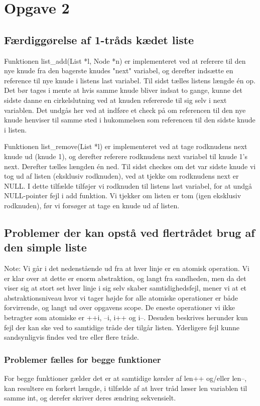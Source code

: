 \section{Opgave 2}

\subsection{Færdiggørelse af 1-tråds kædet liste}
Funktionen list\_add(List *l, Node *n) er implementeret ved at referere til den nye knude fra den bagerste knudes "next" variabel, og derefter indsætte en reference til nye knude i listens last variabel. Til sidst tælles listens længde én op. 
Det bør tages i mente at hvis samme knude bliver indsat to gange, kunne det sidste danne en cirkelslutning ved at knuden refererede til sig selv i next variablen. Det undgås her ved at indføre et check på om referencen til den nye knude henviser til samme sted i hukommelsen som referencen til den sidste knude i listen.

Funktionen list\_remove(List *l) er implementeret ved at tage rodknudens next knude ud (knude 1), og derefter referere rodknudens next variabel til knude 1's next. Derefter tælles længden én ned. Til sidst checkes om det var sidste knude vi tog ud af listen (eksklusiv rodknuden), ved at tjekke om rodknudens next er NULL. I dette tilfælde tilføjer vi rodknuden til listens last variabel, for at undgå NULL-pointer fejl i add funktion. Vi tjekker om listen er tom (igen eksklusiv rodknuden), før vi forsøger at tage en knude ud af listen.

\subsection{Problemer der kan opstå ved flertrådet brug af den simple liste}
Note: Vi går i det nedenstående ud fra at hver linje er en atomisk operation. Vi er klar over at dette er enorm abstraktion, og langt fra sandheden, men da det viser sig at stort set hver linje i sig selv skaber samtidighedsfejl, mener vi at et abstraktionsniveau hvor vi tager højde for alle atomiske operationer er både forvirrende, og langt ud over opgavens scope. De eneste operationer vi ikke betragter som atomiske er ++i, --i, i++ og i--.
Desuden beskrives herunder kun fejl der kan ske ved to samtidige tråde der tilgår listen. Yderligere fejl kunne sandsynligvis findes ved tre eller flere tråde.

\subsubsection*{Problemer fælles for begge funktioner}
For begge funktioner gælder det er at samtidige kørsler af len++ og/eller len--, kan resultere en forkert længde, i tilfælde af at hver tråd læser len variablen til samme int, og derefer skriver deres ændring sekvensielt.

